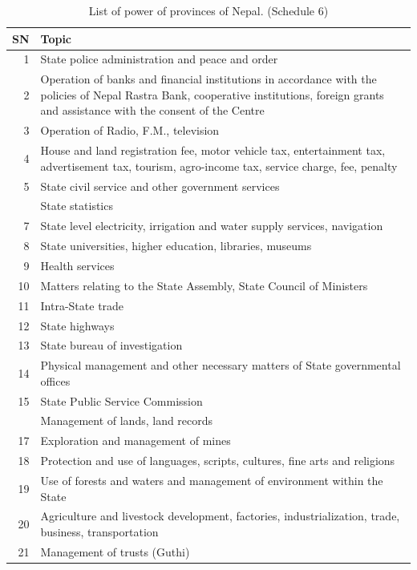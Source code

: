 \documentclass[
  openany]{book}
\begin{document}
\begin{longtable}[t]{r>{\raggedright\arraybackslash}p{35em}}
\caption{\label{tab:power-division-province}List of power of provinces of Nepal. (Schedule 6)}\\
\toprule
SN & Topic\\
\midrule
\rowcolor{gray!6}  1 & State police administration and peace and order\\
2 & Operation of banks and financial institutions in accordance with the policies of Nepal Rastra Bank, cooperative institutions, foreign grants and assistance with the consent of the Centre\\
\rowcolor{gray!6}  3 & Operation of Radio, F.M., television\\
4 & House and land registration fee, motor vehicle tax, entertainment tax, advertisement tax, tourism, agro-income tax, service charge, fee, penalty\\
\rowcolor{gray!6}  5 & State civil service and other government services\\
\addlinespace
6 & State statistics\\
\rowcolor{gray!6}  7 & State level electricity, irrigation and water supply services, navigation\\
8 & State universities, higher education, libraries, museums\\
\rowcolor{gray!6}  9 & Health services\\
10 & Matters relating to the State Assembly, State Council of Ministers\\
\addlinespace
\rowcolor{gray!6}  11 & Intra-State trade\\
12 & State highways\\
\rowcolor{gray!6}  13 & State bureau of investigation\\
14 & Physical management and other necessary matters of State governmental offices\\
\rowcolor{gray!6}  15 & State Public Service Commission\\
\addlinespace
16 & Management of lands, land records\\
\rowcolor{gray!6}  17 & Exploration and management of mines\\
18 & Protection and use of languages, scripts, cultures, fine arts and religions\\
\rowcolor{gray!6}  19 & Use of forests and waters and management of environment within the State\\
20 & Agriculture and livestock development, factories, industrialization, trade, business, transportation\\
\addlinespace
\rowcolor{gray!6}  21 & Management of trusts (Guthi)\\
\bottomrule
\end{longtable}
\endgroup{}
\end{document}
